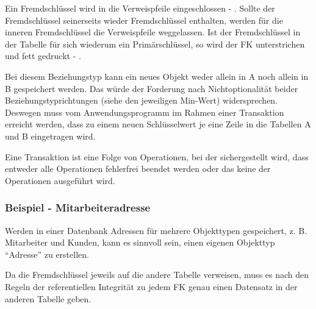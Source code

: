           Ein Fremdschlüssel wird in die Verweispfeile eingeschlossen - . Sollte der Fremd\-schlüs\-sel seinerseits wieder Fremd\-schlüs\-sel enthalten, werden für die inneren Fremd\-schlüs\-sel die Verweispfeile weggelassen. Ist der Fremdschlüssel in der Tabelle für sich wiederum ein Primärschlüssel, so wird der FK unterstrichen und fett gedruckt - .

        \begin{center}
        \end{center}


          Bei diesem Beziehungstyp kann ein neues Objekt weder allein in A noch allein in B gespeichert werden. Das würde der Forderung nach Nichtoptionalität beider Beziehungstyprichtungen (siehe den jeweiligen Min-Wert) widersprechen. Deswegen muss vom Anwendungsprogramm im Rahmen einer Transaktion erreicht werden, dass zu einem neuen Schlüsselwert je eine Zeile in die Tabellen A und B eingetragen wird.

          \begin{merke}
            Eine Transaktion ist eine Folge von Operationen, bei der sichergestellt wird, dass entweder alle Operationen fehlerfrei beendet werden oder das keine der Operationen ausgeführt wird.
          \end{merke}
        \subsubsection{Beispiel - Mitarbeiteradresse}
          Werden in einer Datenbank Adressen für mehrere Objekttypen gespeichert, z. B. Mitarbeiter und Kunden, kann es sinnvoll sein, einen eigenen Objekttyp \enquote{Adresse} zu erstellen.

					Da die Fremdschlüssel jeweils auf die andere Tabelle verweisen, muss es nach den Regeln der referentiellen Integrität zu jedem FK genau einen Datensatz in der anderen Tabelle geben.

